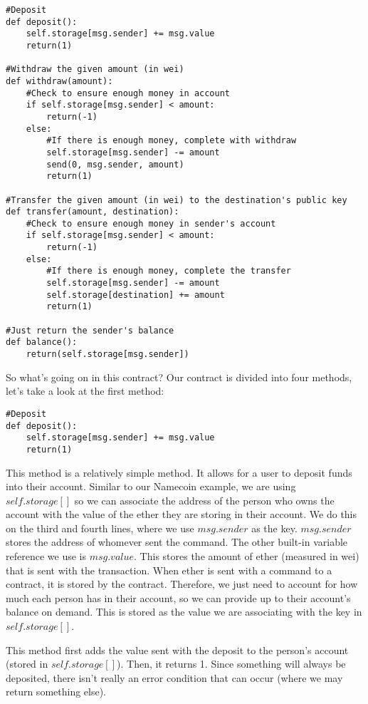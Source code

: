 \documentclass[10pt,twocolumn,letterpaper]{article}
\begin{document}
\begin{mdframed}
\begin{verbatim}
#Deposit
def deposit():
	self.storage[msg.sender] += msg.value
	return(1)

#Withdraw the given amount (in wei)
def withdraw(amount):
	#Check to ensure enough money in account
	if self.storage[msg.sender] < amount:
		return(-1)
	else:
		#If there is enough money, complete with withdraw
		self.storage[msg.sender] -= amount
		send(0, msg.sender, amount)
		return(1)

#Transfer the given amount (in wei) to the destination's public key
def transfer(amount, destination):
	#Check to ensure enough money in sender's account
	if self.storage[msg.sender] < amount:
		return(-1)
	else:
		#If there is enough money, complete the transfer
		self.storage[msg.sender] -= amount
		self.storage[destination] += amount
		return(1)

#Just return the sender's balance
def balance():
	return(self.storage[msg.sender])
\end{verbatim}
\end{mdframed}
		
So what's going on in this contract?
Our contract is divided into four methods, let's take a look at the first method:

\begin{verbatim}
#Deposit
def deposit():
	self.storage[msg.sender] += msg.value
	return(1)
\end{verbatim}

This method is a relatively simple method. It allows for a user to deposit funds into their account. Similar to our Namecoin example, we are using $self.storage[]$ so we can associate the address of the person who owns the account with the value of the ether they are storing in their account. We do this on the third and fourth lines, where we use $msg.sender$ as the key. $msg.sender$ stores the address of whomever sent the command. The other built-in variable reference we use is $msg.value$. This stores the amount of ether (measured in wei) that is sent with the transaction. When ether is sent with a command to a contract, it is stored by the contract. Therefore, we just need to account for how much each person has in their account, so we can provide up to their account's balance on demand. This is stored as the value we are associating with the key in $self.storage[]$.
 
This method first adds the value sent with the deposit to the person's account (stored in $self.storage[]$). Then, it returns 1. Since something will always be deposited, there isn't really an error condition that can occur (where we may return something else). 
\end{document}
